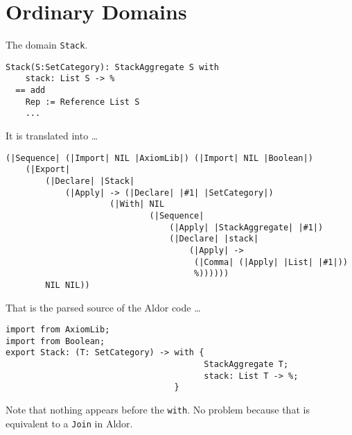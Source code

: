 \documentclass{article}
\begin{document}
\section{Ordinary Domains}\label{sec:Domain}
The domain \verb'Stack'.
\begin{verbatim}
Stack(S:SetCategory): StackAggregate S with
    stack: List S -> %
  == add
    Rep := Reference List S
    ...
\end{verbatim}
It is translated into \ldots
\begin{verbatim}
(|Sequence| (|Import| NIL |AxiomLib|) (|Import| NIL |Boolean|)
    (|Export|
        (|Declare| |Stack|
            (|Apply| -> (|Declare| |#1| |SetCategory|)
                     (|With| NIL
                             (|Sequence|
                                 (|Apply| |StackAggregate| |#1|)
                                 (|Declare| |stack|
                                     (|Apply| ->
                                      (|Comma| (|Apply| |List| |#1|))
                                      %))))))
        NIL NIL))
\end{verbatim}
That is the parsed source of the Aldor code \ldots
\begin{verbatim}
import from AxiomLib;
import from Boolean;
export Stack: (T: SetCategory) -> with {
                                        StackAggregate T;
                                        stack: List T -> %;
                                  }
\end{verbatim}
Note that nothing appears before the \verb'with'. No problem because
that is equivalent to a \verb'Join' in Aldor.



















\end{document}
